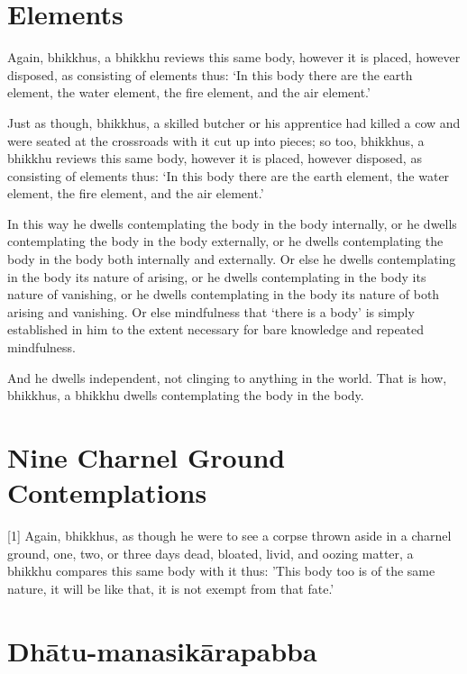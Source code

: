 
\englishPage
\section{Elements}

Again, bhikkhus, a bhikkhu reviews this same body, however it is placed, however
disposed, as consisting of elements thus: `In this body there are the earth
element, the water element, the fire element, and the air element.'

Just as though, bhikkhus, a skilled butcher or his apprentice had killed a cow
and were seated at the crossroads with it cut up into pieces; so too, bhikkhus,
a bhikkhu reviews this same body, however it is placed, however disposed, as
consisting of elements thus: `In this body there are the earth element, the
water element, the fire element, and the air element.'

In this way he dwells contemplating the body in the body internally, or he
dwells contemplating the body in the body externally, or he dwells contemplating
the body in the body both internally and externally. Or else he dwells
contemplating in the body its nature of arising, or he dwells contemplating in
the body its nature of vanishing, or he dwells contemplating in the body its
nature of both arising and vanishing. Or else mindfulness that ‘there is a body’
is simply established in him to the extent necessary for bare knowledge and
repeated mindfulness.

And he dwells independent, not clinging to anything in the world. That is how,
bhikkhus, a bhikkhu dwells contemplating the body in the body.


\section{Nine Charnel Ground Contemplations}

[1] Again, bhikkhus, as though he were to see a corpse thrown aside in a charnel
ground, one, two, or three days dead, bloated, livid, and oozing matter, a
bhikkhu compares this same body with it thus: 'This body too is of the same
nature, it will be like that, it is not exempt from that fate.'

\paliPage
\section*{Dhātu-manasikārapabba}

